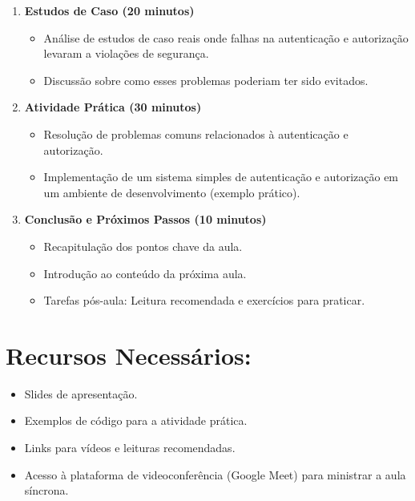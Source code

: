 \documentclass{scrartcl}
\begin{document}
\begin{enumerate}
\item \textbf{\textbf{Estudos de Caso (20 minutos)}}
\begin{itemize}
\item Análise de estudos de caso reais onde falhas na autenticação e autorização
levaram a violações de segurança.
\item Discussão sobre como esses problemas poderiam ter sido evitados.
\end{itemize}

\item \textbf{\textbf{Atividade Prática (30 minutos)}}
\begin{itemize}
\item Resolução de problemas comuns relacionados à autenticação e autorização.
\item Implementação de um sistema simples de autenticação e autorização em um
ambiente de desenvolvimento (exemplo prático).
\end{itemize}

\item \textbf{\textbf{Conclusão e Próximos Passos (10 minutos)}}
\begin{itemize}
\item Recapitulação dos pontos chave da aula.
\item Introdução ao conteúdo da próxima aula.
\item Tarefas pós-aula: Leitura recomendada e exercícios para praticar.
\end{itemize}
\end{enumerate}


\section{Recursos Necessários:}
\label{sec:orga485983}
\begin{itemize}
\item Slides de apresentação.
\item Exemplos de código para a atividade prática.
\item Links para vídeos e leituras recomendadas.
\item Acesso à plataforma de videoconferência (Google Meet) para ministrar a aula
síncrona.
\end{itemize}
\end{document}
